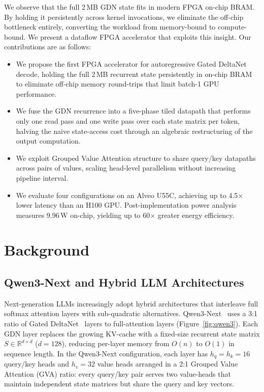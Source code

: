 \documentclass[conference]{IEEEtran}
\begin{document}
We observe that the full 2\,MB GDN state fits in modern FPGA on-chip
BRAM. By holding it persistently across kernel invocations, we eliminate
the off-chip bottleneck entirely, converting the workload from
memory-bound to compute-bound. We present a dataflow FPGA accelerator
that exploits this insight.
Our contributions are as follows:
\begin{itemize}
\item We propose the first FPGA accelerator for autoregressive Gated
  DeltaNet decode, holding the full 2\,MB recurrent state persistently
  in on-chip BRAM to eliminate off-chip memory round-trips that
  limit batch-1 GPU performance.
\item We fuse the GDN recurrence into a five-phase tiled datapath that
  performs only one read pass and one write pass over each state matrix
  per token, halving the naive state-access cost through an algebraic
  restructuring of the output computation.
\item We exploit Grouped Value Attention structure to share query/key
  datapaths across pairs of values, scaling head-level parallelism
  without increasing pipeline interval.
\item We evaluate four configurations on an Alveo U55C, achieving up to
  4.5$\times$ lower latency than an H100 GPU. Post-implementation
  power analysis measures 9.96\,W on-chip, yielding up to
  60$\times$ greater energy efficiency.
\end{itemize}

\section{Background}

\subsection{Qwen3-Next and Hybrid LLM Architectures}

Next-generation LLMs increasingly adopt hybrid architectures that interleave
full softmax attention layers with sub-quadratic alternatives.
Qwen3-Next~\cite{qwen2025qwen3next} uses a 3:1 ratio of Gated
DeltaNet~\cite{yang2025gated} layers to full-attention layers
(Figure~\ref{fig:qwen3}). Each GDN layer replaces the growing KV-cache with
a fixed-size recurrent state matrix $S \in \mathbb{R}^{d \times d}$
($d{=}128$), reducing per-layer memory from $O(n)$ to $O(1)$ in sequence
length. In the Qwen3-Next configuration, each layer has $h_q = h_k = 16$
query/key heads and $h_v = 32$ value heads arranged in a 2:1 Grouped Value
Attention (GVA) ratio: every query/key pair serves two value-heads that
maintain independent state matrices but share the query and key vectors.
\end{document}
